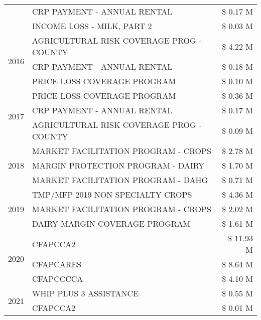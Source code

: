 \begin{tabular}{llr}
 & CRP PAYMENT - ANNUAL RENTAL & \$ 0.17 M \\
 & INCOME LOSS - MILK, PART 2 & \$ 0.03 M \\
\cline{1-3}
\multirow[t]{3}{*}{2016} & AGRICULTURAL RISK COVERAGE PROG - COUNTY & \$ 4.22 M \\
 & CRP PAYMENT - ANNUAL RENTAL & \$ 0.18 M \\
 & PRICE LOSS COVERAGE PROGRAM & \$ 0.10 M \\
\cline{1-3}
\multirow[t]{3}{*}{2017} & PRICE LOSS COVERAGE PROGRAM & \$ 0.36 M \\
 & CRP PAYMENT - ANNUAL RENTAL & \$ 0.17 M \\
 & AGRICULTURAL RISK COVERAGE PROG - COUNTY & \$ 0.09 M \\
\cline{1-3}
\multirow[t]{3}{*}{2018} & MARKET FACILITATION PROGRAM - CROPS & \$ 2.78 M \\
 & MARGIN PROTECTION PROGRAM - DAIRY & \$ 1.70 M \\
 & MARKET FACILITATION PROGRAM - DAHG & \$ 0.71 M \\
\cline{1-3}
\multirow[t]{3}{*}{2019} & TMP/MFP 2019 NON SPECIALTY CROPS & \$ 4.36 M \\
 & MARKET FACILITATION PROGRAM - CROPS & \$ 2.02 M \\
 & DAIRY MARGIN COVERAGE PROGRAM & \$ 1.61 M \\
\cline{1-3}
\multirow[t]{3}{*}{2020} & CFAPCCA2 & \$ 11.93 M \\
 & CFAPCARES & \$ 8.64 M \\
 & CFAPCCCCA & \$ 4.10 M \\
\cline{1-3}
\multirow[t]{2}{*}{2021} & WHIP PLUS 3 ASSISTANCE & \$ 0.55 M \\
 & CFAPCCA2 & \$ 0.01 M \\
\cline{1-3}
\bottomrule
\end{tabular}
